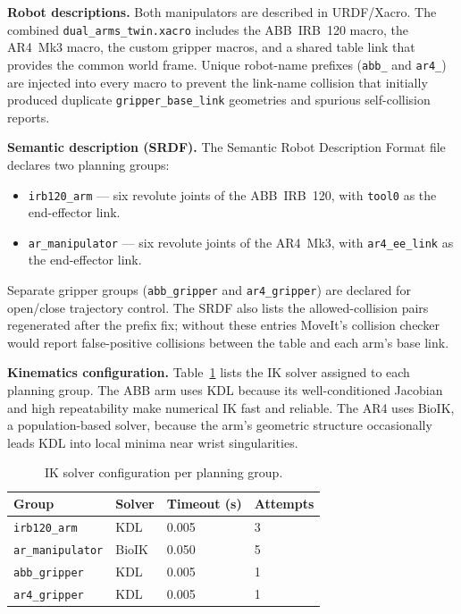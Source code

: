 \textbf{Robot descriptions.} Both manipulators are described in URDF/Xacro.  The combined
\texttt{dual\_arms\_twin.xacro} includes the ABB~IRB~120 macro, the AR4~Mk3 macro, the
custom gripper macros, and a shared table link that provides the common world frame.  Unique
robot-name prefixes (\texttt{abb\_} and \texttt{ar4\_}) are injected into every macro to
prevent the link-name collision that initially produced duplicate
\texttt{gripper\_base\_link} geometries and spurious self-collision reports.

\textbf{Semantic description (SRDF).} The Semantic Robot Description Format file declares two planning groups:

\begin{itemize}
    \item \texttt{irb120\_arm} — six revolute joints of the ABB~IRB~120, with
          \texttt{tool0} as the end-effector link.
    \item \texttt{ar\_manipulator} — six revolute joints of the AR4~Mk3, with
          \texttt{ar4\_ee\_link} as the end-effector link.
\end{itemize}

Separate gripper groups (\texttt{abb\_gripper} and \texttt{ar4\_gripper}) are declared for
open/close trajectory control.  The SRDF also lists the allowed-collision pairs regenerated
after the prefix fix; without these entries MoveIt's collision checker would report
false-positive collisions between the table and each arm's base link.

\textbf{Kinematics configuration.} Table~\ref{tab:ch6_ik} lists the IK solver assigned to each planning group.
The ABB arm uses KDL because its well-conditioned Jacobian and high repeatability make
numerical IK fast and reliable.  The AR4 uses BioIK, a population-based solver, because the
arm's geometric structure occasionally leads KDL into local minima near wrist singularities.

\begin{table}[H]
\centering
\caption{IK solver configuration per planning group.}
\label{tab:ch6_ik}
\setlength{\tabcolsep}{6pt}
\begin{tabular}{llll}
\toprule
\textbf{Group}          & \textbf{Solver} & \textbf{Timeout (s)} & \textbf{Attempts} \\
\midrule
\texttt{irb120\_arm}    & KDL             & 0.005                & 3 \\
\texttt{ar\_manipulator}& BioIK           & 0.050                & 5 \\
\texttt{abb\_gripper}   & KDL             & 0.005                & 1 \\
\texttt{ar4\_gripper}   & KDL             & 0.005                & 1 \\
\bottomrule
\end{tabular}
\end{table}

